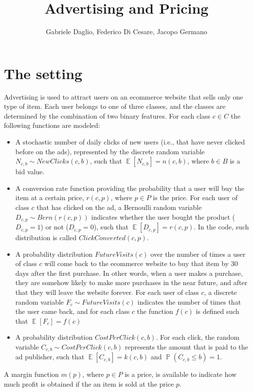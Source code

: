 \documentclass[11pt]{article} %
\title{Advertising and Pricing}
\author{Gabriele Daglio, Federico Di Cesare, Jacopo Germano}
\DeclareMathOperator{\EX}{\mathbb{E}}
\DeclareMathOperator{\Prob}{\mathbb{P}}
\begin{document}
\maketitle

\section{The setting}

Advertising is used to attract users on an ecommerce website that sells only one type of item. Each user belongs to one of three classes, and the classes are determined by the combination of two binary features. For each class $c \in C$ the following functions are modeled:
\begin{itemize}
\item A stochastic number of daily clicks of new users (i.e., that have never clicked before on the ads), represented by the discrete random variable $N_{c,b}\sim NewClicks(c,b)$, such that $\EX[N_{c,b}]=n(c,b)$, where $b \in B$ is a bid value. 
\item A conversion rate function providing the probability that a user will buy the item at a certain price,  $r(c,p)$, where $p \in P$ is the price. For each user of class $c$ that has clicked on the ad, a Bernoulli random variable $D_{c,p} \sim Bern(r(c,p))$ indicates whether the user bought the product ($D_{c,p}=1$) or not ($D_{c,p}=0$), such that $\EX[D_{c,p}]=r(c,p)$. In the code, such distribution is called $ClickConverted(c,p)$.
\item A probability distribution $FutureVisits(c)$ over the number of times a user of class $c$ will come back to the ecommerce website to buy that item by 30 days after the first purchase. In other words, when a user makes a purchase, they are somehow likely to make more purchases in the near future, and after that they will leave the website forever. For each user of class $c$, a discrete random variable $F_c \sim FutureVisits(c)$ indicates the number of times that the user came back, and for each class $c$ the function $f(c)$ is defined such that $\EX[F_c] = f(c)$
\item A probability distribution $CostPerClick(c,b)$. For each click, the random variable $C_{c,b}\sim CostPerClick(c,b)$ represents the amount that is paid to the ad publisher, such that $\EX[C_{c,b}] = k(c,b)$ and $\Prob(C_{c,b} \leq b) = 1$.
\end{itemize}

A margin function $m(p)$, where $p \in P$ is a price, is available to indicate how much profit is obtained if the an item is sold at the price $p$. 
\end{document}
